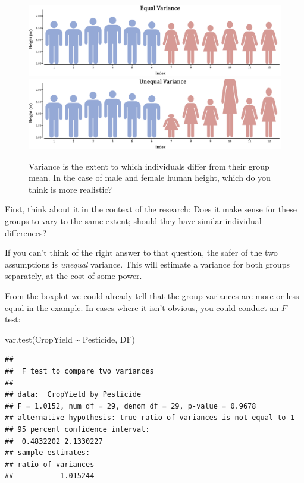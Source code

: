 \documentclass[
]{book}
\newenvironment{Shaded}{\begin{snugshade}}{\end{snugshade}}
\newcommand{\FunctionTok}[1]{\textcolor[rgb]{0.00,0.00,0.00}{#1}}
\newcommand{\NormalTok}[1]{#1}
\newcommand{\SpecialCharTok}[1]{\textcolor[rgb]{0.00,0.00,0.00}{#1}}
\begin{document}
\begin{figure}
\includegraphics[width=0.75\linewidth]{figures/sexHeight2} \includegraphics[width=0.75\linewidth]{figures/unequalVariance2} \caption{Variance is the extent to which individuals differ from their group mean. In the case of male and female human height, which do you think is more realistic?}\label{fig:unnamed-chunk-17}
\end{figure}

First, think about it in the context of the research: Does it make sense for these groups to vary to the same extent; should they have similar individual differences?

If you can't think of the right answer to that question, the safer of the two assumptions is \emph{unequal} variance. This will estimate a variance for both groups separately, at the cost of some power.

From the \protect\hyperlink{vis-t}{boxplot} we could already tell that the group variances are more or less equal in the example. In cases where it isn't obvious, you could conduct an \(F\)-test:

\begin{Shaded}
\begin{Highlighting}[]
\FunctionTok{var.test}\NormalTok{(CropYield }\SpecialCharTok{\textasciitilde{}}\NormalTok{ Pesticide, DF)}
\end{Highlighting}
\end{Shaded}

\begin{verbatim}
## 
##  F test to compare two variances
## 
## data:  CropYield by Pesticide
## F = 1.0152, num df = 29, denom df = 29, p-value = 0.9678
## alternative hypothesis: true ratio of variances is not equal to 1
## 95 percent confidence interval:
##  0.4832202 2.1330227
## sample estimates:
## ratio of variances 
##           1.015244
\end{verbatim}
\end{document}
